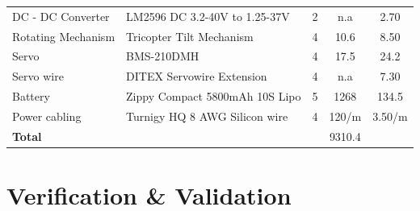{\begin{table}[H]
\begin{tabular}{m{4cm}m{4cm}m{0.6cm}cc}
                    \\\hdashline
    DC - DC Converter    & LM2596 DC 3.2-40V to 1.25-37V                                    & 2    & n.a             & 2.70                        \\\hdashline
    Rotating Mechanism     & Tricopter Tilt Mechanism                                            & 4           & 10.6                       & 8.50                       \\\hdashline
    Servo              & BMS-210DMH                                                               & 4           & 17.5                        & 24.2                      \\\hdashline
    Servo wire        & DITEX Servowire Extension                                              &  4          &  n.a  & 7.30
                    \\\hdashline
    Battery            & Zippy Compact 5800mAh 10S Lipo                                           & 5           & 1268                       & 134.5
    \\\hdashline
    Power cabling            & Turnigy HQ 8 AWG Silicon wire                                             & 4           & 120/m                     & 3.50/m                 \\ \hline \hdashline
     \textbf{Total}   &     &    &  9310.4 & 
        \\\bottomrule
    \end{tabular}
\end{table}

\section{Verification \& Validation}
\label{sec:VNVPNP}

}
